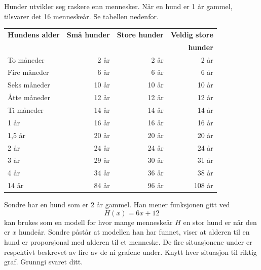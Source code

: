 \newpage
{}
Hunder utvikler seg raskere enn mennesker. Når en hund er 1 år gammel, tilsvarer
det 16 menneskeår. Se tabellen nedenfor.
\begin{center}
	\small
	\begin{tabular}{l r r r}
		\hline
		\rowcolor{gray!20} \textbf{Hundens alder} & \textbf{Små hunder} & \textbf{Store hunder} & \textbf{Veldig store} \\
		\rowcolor{gray!20} & & & \textbf{hunder} \\
		\hline
		To måneder   & 2 år   & 2 år   & 2 år  \\
		\rowcolor{gray!20} Fire måneder & 6 år   & 6 år   & 6 år  \\
		Seks måneder & 10 år  & 10 år  & 10 år \\
		\rowcolor{gray!20} Åtte måneder & 12 år  & 12 år  & 12 år \\
		Ti måneder   & 14 år  & 14 år  & 14 år \\
		\rowcolor{gray!20} 1 år         & 16 år  & 16 år  & 16 år \\
		1,5 år       & 20 år  & 20 år  & 20 år \\
		\rowcolor{gray!20} 2 år         & 24 år  & 24 år  & 24 år \\
		3 år         & 29 år  & 30 år  & 31 år \\
		\rowcolor{gray!20} 4 år         & 34 år  & 36 år  & 38 år \\
		14 år        & 84 år  & 96 år  & 108 år \\
		\hline
		
	\end{tabular}
\end{center}
Sondre har en hund som er 2 år gammel. Han mener funksjonen gitt ved
\[ H(x)=6x+12 \]
kan brukes som en modell for hvor mange menneskeår $H$ en stor hund er når den
er $x$ hundeår.
Sondre påstår at modellen han har funnet, viser at alderen til en hund er proporsjonal med alderen til et menneske.
\newpage
{}
De fire situasjonene under er respektivt beskrevet av fire av de ni grafene under. Knytt hver situasjon til riktig graf. Grunngi svaret ditt.
